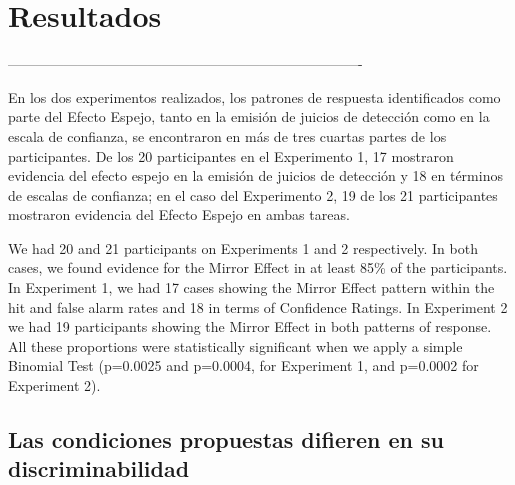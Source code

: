 
\chapter{Resultados} %

\label{Cap_Res} %

----------------------------------------------------------------------------

En los dos experimentos realizados, los patrones de respuesta identificados como parte del Efecto Espejo, tanto en la emisión de juicios de detección como en la escala de confianza, se encontraron en más de tres cuartas partes de los participantes. De los 20 participantes en el Experimento 1, 17 mostraron evidencia del efecto espejo en la emisión de juicios de detección y 18 en términos de escalas de confianza; en el caso del Experimento 2, 19 de los 21 participantes mostraron evidencia del Efecto Espejo en ambas tareas. 


We had 20 and 21 participants on Experiments 1 and 2 respectively. In both cases, we found evidence for the Mirror Effect in at least 85\% of the participants. In Experiment 1, we had 17 cases showing the Mirror Effect pattern within the hit and false alarm rates and 18 in terms of Confidence Ratings. In Experiment 2 we had 19 participants showing the Mirror Effect in both patterns of response. All these proportions were statistically significant when we apply a simple Binomial Test (p=0.0025 and p=0.0004, for Experiment 1, and p=0.0002 for Experiment 2).

\section{Las condiciones propuestas difieren en su discriminabilidad}



